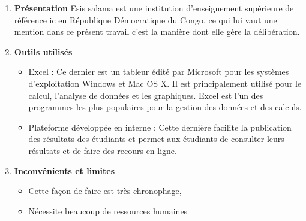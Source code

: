 \begin{enumerate}[label=\alph*]
    \item \textbf{Présentation} \newline Esis salama est une institution d'enseignement supérieure de référence ic en République Démocratique du Congo, ce qui lui vaut une mention dans ce présent travail c'est la manière dont elle gère la délibération.
    \item \textbf{Outils utilisés} 
        \begin{itemize}
            \item Excel : Ce dernier est un tableur édité par Microsoft pour les systèmes d'exploitation Windows et Mac OS X. Il est principalement utilisé pour le calcul, l'analyse de données et les graphiques. Excel est l'un des programmes les plus populaires pour la gestion des données et des calculs.
            \item Plateforme développée en interne :  Cette dernière facilite la publication des résultats des étudiants et permet aux étudiants de consulter leurs résultats et de faire des recours en ligne.
        \end{itemize}
    \item \textbf{Inconvénients et limites}
        \begin{itemize}
            \item Cette façon de faire est très chronophage,
            \item Nécessite beaucoup de ressources humaines
        \end{itemize}
\end{enumerate}